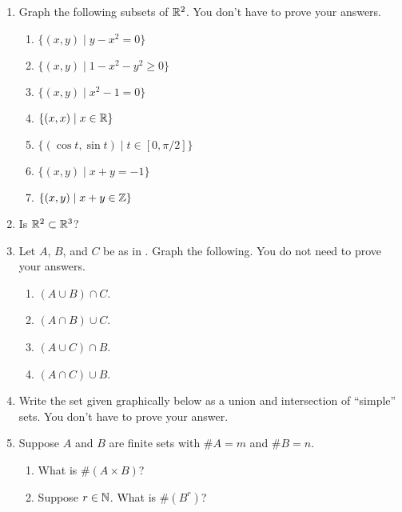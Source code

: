 \begin{enumerate}
    \item Graph the following subsets of $\mathbb{R}^2$. You don't have to prove your answers.
  \begin{enumerate}
      \item $\{(x, y) \mid y - x^2 = 0\}$
      \item $\{(x, y) \mid 1 - x^2 - y^2 \geq 0\}$
      \item $\{(x, y) \mid x^2 - 1 = 0\}$
      \item $\{(x, x) \mid x \in \mathbb{R}\}$
      \item $\{(\cos t, \sin t) \mid t \in [0, \pi/2]\}$
      \item $\{(x, y) \mid x + y = -1\}$
      \item $\{(x, y) \mid x + y \in \mathbb{Z}\}$
  \end{enumerate}

    \item Is $\mathbb{R}^2 \subset \mathbb{R}^3$?

    \item Let $A$, $B$, and $C$ be as in . Graph the following. You do not need to prove your answers.
  \begin{enumerate}
      \item $(A \cup B) \cap C$.
      \item $(A \cap B) \cup C$.
      \item $(A \cup C) \cap B$.
      \item $(A \cap C) \cup B$.
  \end{enumerate}

    \item Write the set given graphically below as a union and intersection of ``simple'' sets. You don't have to prove your answer.
    \begin{center}
  \end{center}


    \item Suppose $A$ and $B$ are finite sets with $\# A = m$ and $\# B = n$.
  \begin{enumerate}
      \item What is $\# (A \times B)$?
      \item Suppose $r \in \mathbb{N}$. What is $\# (B^r)$?
  \end{enumerate}


\end{enumerate}
